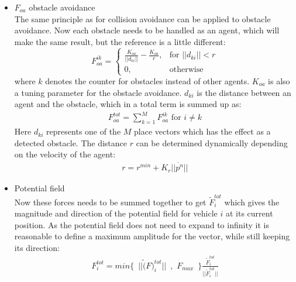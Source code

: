 \begin{itemize}
\item $F_{oa}$ obstacle avoidance\\
The same principle as for collision avoidance can be applied to obstacle avoidance. Now each obstacle needs to be handled as an agent, which will make the same result, but the reference is a little different:
\[
    F_{oa}^{ik}= 
\begin{cases}
    \frac{K_{oa}}{||d_{ki}||}-\frac{K_{oa}}{r},& \text{for } ||d_{ki}||<r\\
    0,              & \text{otherwise}
\end{cases}
\]
where $k$ denotes the counter for obstacles instead of other agents. $K_{oa}$ is also a tuning parameter for the obstacle avoidance. $d_{ki}$ is the distance between an agent and the obstacle, which in a total term is summed up as:
\begin{align}
F_{oa}^{tot} = \sum\limits_{k=1}^MF_{oa}^{ik} \text{ for } i\neq k
\end{align}
Here $d_{ki}$ represents one of the $M$ place vectors which has the effect as a detected obstacle.
The distance $r$ can be determined dynamically depending on the velocity of the agent:
\begin{align}
r = r^{min} + K_r||\dot{p^n}||
\end{align}

\item Potential field\\
Now these forces needs to be summed together to get $\tilde{F}_i^{tot}$ which gives the magnitude and direction of the potential field for vehicle $i$ at its current position. As the potential field does not need to expand to infinity it is reasonable to define a maximum amplitude for the vector, while still keeping its direction:
\begin{align}
F_i^{tot} = min\{\,\,\,||\tilde(F)_i^{tot}||\,\,\,,\,\,F_{max}\,\,\,\}\frac{\tilde{F}_i^{tot}}{||\tilde{F}_i^{tot}||}
\end{align}

\end{itemize}



